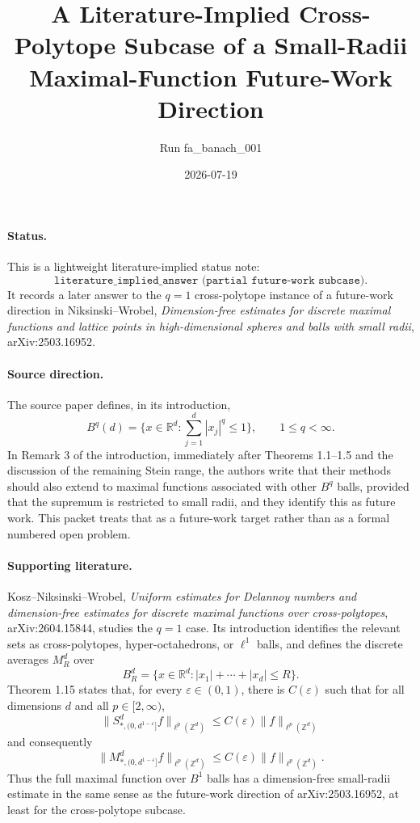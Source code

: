 \documentclass[11pt]{article}
\title{A Literature-Implied Cross-Polytope Subcase of a Small-Radii Maximal-Function Future-Work Direction}
\author{Run fa\_banach\_001}
\date{2026-07-19}
\newcommand{\Z}{\mathbb Z}
\newcommand{\R}{\mathbb R}
\begin{document}
\maketitle

\paragraph{Status.}
This is a lightweight literature-implied status note:
\[
\texttt{literature\_implied\_answer (partial future-work subcase).}
\]
It records a later answer to the \(q=1\) cross-polytope instance of a
future-work direction in Niksinski--Wrobel,
\emph{Dimension-free estimates for discrete maximal functions and lattice
points in high-dimensional spheres and balls with small radii},
arXiv:2503.16952.

\paragraph{Source direction.}
The source paper defines, in its introduction,
\[
B^q(d)=\{x\in\R^d:\sum_{j=1}^d |x_j|^q\le 1\},\qquad 1\le q<\infty.
\]
In Remark 3 of the introduction, immediately after Theorems 1.1--1.5 and the
discussion of the remaining Stein range, the authors write that their methods
should also extend to maximal functions associated with other \(B^q\) balls,
provided that the supremum is restricted to small radii, and they identify this
as future work.  This packet treats that as a future-work target rather than as
a formal numbered open problem.

\paragraph{Supporting literature.}
Kosz--Niksinski--Wrobel,
\emph{Uniform estimates for Delannoy numbers and dimension-free estimates for
discrete maximal functions over cross-polytopes}, arXiv:2604.15844, studies
the \(q=1\) case.  Its introduction identifies the relevant sets as
cross-polytopes, hyper-octahedrons, or \(\ell^1\) balls, and defines the
discrete averages \(M_R^d\) over
\[
B_R^d=\{x\in\R^d: |x_1|+\cdots+|x_d|\le R\}.
\]
Theorem 1.15 states that, for every \(\varepsilon\in(0,1)\), there is
\(C(\varepsilon)\) such that for all dimensions \(d\) and all \(p\in[2,\infty)\),
\[
\|S^d_{\ast,(0,d^{1-\varepsilon}]} f\|_{\ell^p(\Z^d)}
   \le C(\varepsilon)\|f\|_{\ell^p(\Z^d)}
\]
and consequently
\[
\|M^d_{\ast,(0,d^{1-\varepsilon}]} f\|_{\ell^p(\Z^d)}
   \le C(\varepsilon)\|f\|_{\ell^p(\Z^d)}.
\]
Thus the full maximal function over \(B^1\) balls has a dimension-free
small-radii estimate in the same sense as the future-work direction of
arXiv:2503.16952, at least for the cross-polytope subcase.
\end{document}
